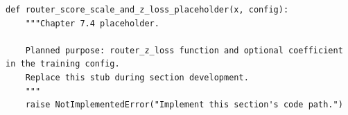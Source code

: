 \begin{lstlisting}[style=bookpython,caption={Planned code placeholder for router score scale and z loss.},label={lst:ch07-router-score-scale-and-z-loss}]
def router_score_scale_and_z_loss_placeholder(x, config):
    """Chapter 7.4 placeholder.

    Planned purpose: router_z_loss function and optional coefficient in the training config.
    Replace this stub during section development.
    """
    raise NotImplementedError("Implement this section's code path.")
\end{lstlisting}
